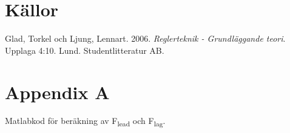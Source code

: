 \documentclass[a4wide]{article}
\begin{document}
\newpage


\section{Källor}
Glad, Torkel och Ljung, Lennart. 2006. \textit{Reglerteknik - Grundläggande teori}. Upplaga 4:10. Lund. Studentlitteratur AB.
\newpage


\section{Appendix A}
Matlabkod för beräkning av F\textsubscript{lead} och F\textsubscript{lag}.

\end{document}
